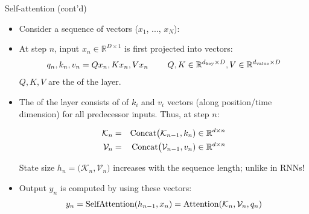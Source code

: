 \begin{frame}{Self-attention (cont'd)}
\begin{itemize}
\item Consider a sequence of vectors ($x_1$, ..., $x_N$):
\pause
\item At step $n$, input $x_n \in \mathbb{R}^{D \times 1}$ is first projected into  vectors:
   \begin{eqnarray*}
q_n, k_n, v_n = Qx_n, Kx_n, Vx_n \text{\hspace{8mm}} Q,K \in \mathbb{R}^{d_{\text{key}} \times D}, V \in \mathbb{R}^{d_{\text{value}} \times D}
    \end{eqnarray*}
$Q,K,V$ are the  of the layer.
\pause
\item The  of the layer consists of  of $k_i$ and $v_i$ vectors (along position/time dimension)
for all predecessor inputs. Thus, at step $n$:

\begin{eqnarray*}
\mathcal{K}_n &=& \operatorname{Concat}\!\big(\mathcal{K}_{n-1}, k_n) \in \mathbb{R}^{d \times n} \\
\mathcal{V}_n &=& \operatorname{Concat}\!\big(\mathcal{V}_{n-1}, v_n) \in \mathbb{R}^{d \times n} \\
\end{eqnarray*}


\pause
State size $h_n = \big(\mathcal{K}_n, \mathcal{V}_n\big)$ increases with the sequence length; unlike in RNNs!
\pause
\item Output $y_n $ is computed by  using these vectors:
   \begin{eqnarray*}
y_n = \operatorname{SelfAttention}(h_{n-1},x_n) = \operatorname{Attention}(\mathcal{K}_n, \mathcal{V}_n, q_n)
    \end{eqnarray*}
\end{itemize}
\end{frame}

